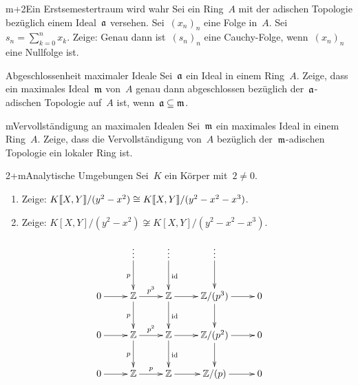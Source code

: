 \documentclass{uebblatt}
\begin{document}

\begin{aufgabe}{m+2}{Ein Erstsemestertraum wird wahr}
Sei ein Ring~$A$ mit der adischen Topologie bezüglich einem
Ideal~$\mathfrak{a}$ versehen.
Sei~$(x_n)_n$ eine Folge in~$A$. Sei~$s_n = \sum_{k=0}^n x_k$.
Zeige: Genau dann ist~$(s_n)_n$ eine Cauchy-Folge,
wenn~$(x_n)_n$ eine Nullfolge ist.
\end{aufgabe}


\begin{aufgabe}{3}{Abgeschlossenheit maximaler Ideale}
Sei~$\mathfrak{a}$ ein Ideal in einem Ring~$A$. Zeige, dass ein maximales Ideal~$\mathfrak{m}$
von~$A$ genau dann abgeschlossen bezüglich der~$\mathfrak{a}$-adischen Topologie
auf~$A$ ist, wenn~$\mathfrak{a} \subseteq \mathfrak{m}$.
\end{aufgabe}

\begin{aufgabe}{m}{Vervollständigung an maximalen Idealen}
Sei~$\mathfrak{m}$ ein maximales Ideal in einem Ring~$A$. Zeige, dass die
Vervollständigung von~$A$ bezüglich der~$\mathfrak{m}$-adischen Topologie ein lokaler
Ring ist.
\end{aufgabe}

\begin{aufgabe}{2+m}{Analytische Umgebungen}
Sei~$K$ ein Körper mit~$2 \neq 0$.
\begin{enumerate}
\item Zeige: ${K}\llbracket{X,Y}\rrbracket/(y^2-x^2) \cong {K}\llbracket{X,Y}\rrbracket/(y^2-x^2-x^3)$.
\item Zeige: $K[X,Y]/(y^2-x^2) \not\cong K[X,Y]/(y^2-x^2-x^3)$.
\end{enumerate}
\end{aufgabe}

\setlength{\wrapoverhang}{1.3cm}
\setlength{\columnsep}{0.8cm}
\begin{figure}
  \vspace{-6em}
  \scriptsize
  \[ \xymatrix{
    & \vdots \ar[d]_p & \vdots \ar[d]^\id & \vdots \ar[d] \\
    0 \ar[r] & \ZZ \ar[r]^{p^3}\ar[d]_p & \ZZ \ar[r]\ar[d]^\id & \ZZ/(p^3) \ar[r]\ar[d] & 0 \\
    0 \ar[r] & \ZZ \ar[r]^{p^2}\ar[d]_p & \ZZ \ar[r]\ar[d]^\id & \ZZ/(p^2) \ar[r]\ar[d] & 0 \\
    0 \ar[r] & \ZZ \ar[r]^p & \ZZ \ar[r] & \ZZ/(p) \ar[r] & 0
  } \]
\end{figure}
\end{document}
